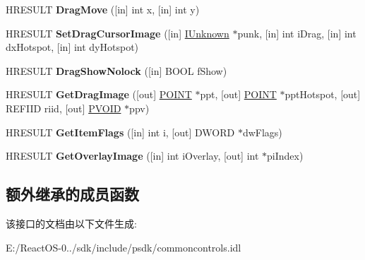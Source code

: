 \begin{DoxyCompactItemize}
\item 
\mbox{\label{interface_i_image_list_a8232054a053f4c5ba299e3646e9b7c5f}} 
H\+R\+E\+S\+U\+LT {\bfseries Drag\+Move} (\mbox{[}in\mbox{]} int x, \mbox{[}in\mbox{]} int y)
\item 
\mbox{\label{interface_i_image_list_afcb0a2d44f93576dda83858eafb7082b}} 
H\+R\+E\+S\+U\+LT {\bfseries Set\+Drag\+Cursor\+Image} (\mbox{[}in\mbox{]} \hyperlink{interface_i_unknown}{I\+Unknown} $\ast$punk, \mbox{[}in\mbox{]} int i\+Drag, \mbox{[}in\mbox{]} int dx\+Hotspot, \mbox{[}in\mbox{]} int dy\+Hotspot)
\item 
\mbox{\label{interface_i_image_list_ae50e6d75e3e1259f7fce551b4d1cd005}} 
H\+R\+E\+S\+U\+LT {\bfseries Drag\+Show\+Nolock} (\mbox{[}in\mbox{]} B\+O\+OL f\+Show)
\item 
\mbox{\label{interface_i_image_list_a1997cb40559424e5f28a591699c71709}} 
H\+R\+E\+S\+U\+LT {\bfseries Get\+Drag\+Image} (\mbox{[}out\mbox{]} \hyperlink{structtag_p_o_i_n_t}{P\+O\+I\+NT} $\ast$ppt, \mbox{[}out\mbox{]} \hyperlink{structtag_p_o_i_n_t}{P\+O\+I\+NT} $\ast$ppt\+Hotspot, \mbox{[}out\mbox{]} R\+E\+F\+I\+ID riid, \mbox{[}out\mbox{]} \hyperlink{interfacevoid}{P\+V\+O\+ID} $\ast$ppv)
\item 
\mbox{\label{interface_i_image_list_abe23a1666a2b9c8b455004c6e11bdf4f}} 
H\+R\+E\+S\+U\+LT {\bfseries Get\+Item\+Flags} (\mbox{[}in\mbox{]} int i, \mbox{[}out\mbox{]} D\+W\+O\+RD $\ast$dw\+Flags)
\item 
\mbox{\label{interface_i_image_list_ad5d6da154a99063d463eab9e0432296d}} 
H\+R\+E\+S\+U\+LT {\bfseries Get\+Overlay\+Image} (\mbox{[}in\mbox{]} int i\+Overlay, \mbox{[}out\mbox{]} int $\ast$pi\+Index)
\end{DoxyCompactItemize}
\subsection*{额外继承的成员函数}


该接口的文档由以下文件生成\+:\begin{DoxyCompactItemize}
\item 
E\+:/\+React\+O\+S-\/0../sdk/include/psdk/commoncontrols.\+idl\end{DoxyCompactItemize}
